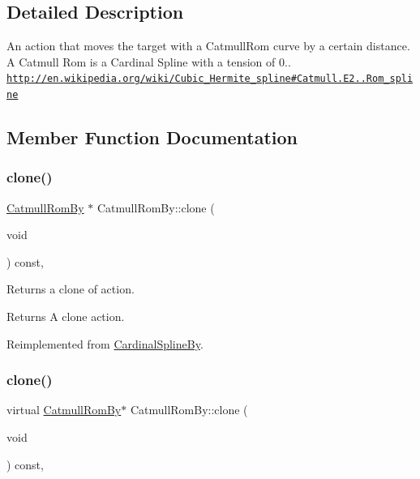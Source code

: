 \subsection{Detailed Description}
An action that moves the target with a Catmull\+Rom curve by a certain distance. A Catmull Rom is a Cardinal Spline with a tension of 0.. \href{http://en.wikipedia.org/wiki/Cubic_Hermite_spline#Catmull.E2.80.93Rom_spline}{\tt http\+://en.\+wikipedia.\+org/wiki/\+Cubic\+\_\+\+Hermite\+\_\+spline\#\+Catmull.\+E2..\+Rom\+\_\+spline} 

\subsection{Member Function Documentation}
\mbox{\label{classCatmullRomBy_a972f2e516b44eaa141ae270f575024e5}} 
\subsubsection{\texorpdfstring{clone()}{clone()}\hspace{0.1cm}{\footnotesize\ttfamily [1/2]}}
{\footnotesize\ttfamily \hyperlink{classCatmullRomBy}{Catmull\+Rom\+By} $\ast$ Catmull\+Rom\+By\+::clone (\begin{DoxyParamCaption}\item[{void}]{ }\end{DoxyParamCaption}) const\hspace{0.3cm}{\ttfamily [override]}, {\ttfamily [virtual]}}

Returns a clone of action.

\begin{DoxyReturn}{Returns}
A clone action. 
\end{DoxyReturn}


Reimplemented from \hyperlink{classCardinalSplineBy_a35b00381b2823644533fd485817b147e}{Cardinal\+Spline\+By}.

\mbox{\label{classCatmullRomBy_aea28e624bd562521e444af38384470aa}} 
\subsubsection{\texorpdfstring{clone()}{clone()}\hspace{0.1cm}{\footnotesize\ttfamily [2/2]}}
{\footnotesize\ttfamily virtual \hyperlink{classCatmullRomBy}{Catmull\+Rom\+By}$\ast$ Catmull\+Rom\+By\+::clone (\begin{DoxyParamCaption}\item[{void}]{ }\end{DoxyParamCaption}) const\hspace{0.3cm}{\ttfamily [override]}, {\ttfamily [virtual]}}


